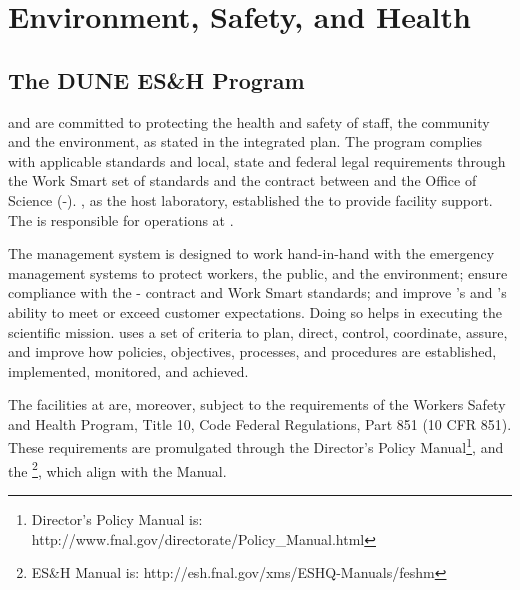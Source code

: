 \section{Environment, Safety, and Health}
\label{sec:es-tc-eshq}

\subsection{The DUNE ES\&H Program}
\label{sec:es-tc-eshq-prog}

 and  are committed to protecting the health and
safety of staff, the community and the environment, as stated in the
 integrated  plan.  The
 program complies with applicable standards and local,
state and federal legal requirements through the  Work Smart set
of standards and the contract between  and the
 Office of Science (-). , as the host
laboratory, established the  to provide
facility support.  The  is responsible
for  operations at .

The   management system is
designed to work hand-in-hand with the  emergency
management systems to protect workers, the public, and the environment;
ensure compliance with the - contract and \fnal Work Smart
standards; and improve 's and 's ability to meet or
exceed customer expectations. Doing so helps in executing the
scientific mission.   uses a set of criteria to plan, direct,
control, coordinate, assure, and improve how  policies,
objectives, processes, and procedures are established, implemented,
monitored, and achieved. 

The  facilities at  are, moreover, subject to
the requirements of the  Workers Safety and Health Program,
Title 10, Code Federal Regulations, Part 851 (10 CFR 851). These
requirements are promulgated through the  Director's Policy
Manual\footnote{\fnal Director's Policy Manual is:
  http://www.fnal.gov/directorate/Policy\_Manual.html}, and the \footnote{\fnal ES\&H Manual is:
  http://esh.fnal.gov/xms/ESHQ-Manuals/feshm}, which
align with the   Manual.

